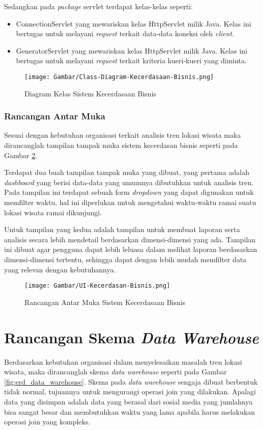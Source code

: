 Sedangkan pada \textit{package} servlet terdapat kelas-kelas seperti:
\begin{itemize}
	\item ConnectionServlet yang mewariskan kelas HttpServlet milik Java. Kelas ini bertugas untuk melayani \textit{request} terkait data-data koneksi oleh \textit{client}.
	\item GeneratorServlet yang mewariskan kelas HttpServlet milik Java. Kelas ini bertugas untuk melayani \textit{request} terkait kriteria kueri-kueri yang diminta.
\end{itemize}

\begin{figure}[H]
	\centering
	\texttt{[image: Gambar/Class-Diagram-Kecerdasaan-Bisnis.png]}
	\caption[Diagram Kelas Sistem Kecerdasaan Bisnis]{Diagram Kelas Sistem Kecerdasaan Bisnis} 
	\label{fig:bi_kelas}
\end{figure}

\subsubsection{Rancangan Antar Muka}
Sesuai dengan kebutuhan organisasi terkait analisis tren lokasi wisata maka dirancanglah tampilan tampak muka sistem kecerdasan bisnis seperti pada Gambar \ref{fig:bi_ui}. 

Terdapat dua buah tampilan tampak muka yang dibuat, yang pertama adalah \textit{dashboard} yang berisi data-data yang umumnya dibutuhkan untuk analisis tren. Pada tampilan ini terdapat sebuah form \textit{dropdown} yang dapat digunakan untuk memfilter waktu, hal ini diperlukan untuk mengetahui waktu-waktu ramai suatu lokasi wisata ramai dikunjungi. 

Untuk tampilan yang kedua adalah tampilan untuk membuat laporan serta analisis secara lebih mendetail berdasarkan dimensi-dimensi yang ada. Tampilan ini dibuat agar pengguna dapat lebih leluasa dalam melihat laporan berdasarkan dimensi-dimensi tertentu, sehingga dapat dengan lebih mudah memfilter data yang relevan dengan kebutuhannya.

\begin{figure}[H]
	\centering
	\texttt{[image: Gambar/UI-Kecerdasan-Bisnis.png]}
	\caption[Rancangan Antar Muka Sistem Kecerdasaan Bisnis]{Rancangan Antar Muka Sistem Kecerdasaan Bisnis} 
	\label{fig:bi_ui}
\end{figure}

\section{Rancangan Skema \textit{Data Warehouse}}
Berdasarkan kebutuhan organisasi dalam menyelesaikan masalah tren lokasi wisata, maka dirancanglah skema \textit{data warehouse} seperti pada Gambar \ref{fig:erd_data_warehouse}. Skema pada \textit{data warehouse} sengaja dibuat berbentuk tidak normal, tujuannya untuk mengurangi operasi join yang dilakukan. Apalagi data yang disimpan adalah data yang berasal dari sosial media yang jumlahnya bisa sangat besar dan membutuhkan waktu yang lama apabila harus melakukan operasi join yang kompleks.

